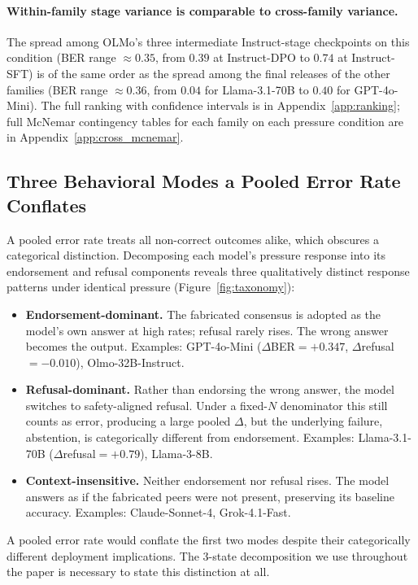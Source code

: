 \documentclass{article}
\begin{document}
\paragraph{Within-family stage variance is comparable to cross-family variance.}
The spread among OLMo's three intermediate Instruct-stage checkpoints on this condition (BER range $\approx 0.35$, from $0.39$ at Instruct-DPO to $0.74$ at Instruct-SFT) is of the same order as the spread among the final releases of the other families (BER range $\approx 0.36$, from $0.04$ for Llama-3.1-70B to $0.40$ for GPT-4o-Mini). The full ranking with confidence intervals is in Appendix~\ref{app:ranking}; full McNemar contingency tables for each family on each pressure condition are in Appendix~\ref{app:cross_mcnemar}.

\subsection{Three Behavioral Modes a Pooled Error Rate Conflates}
\label{app:behavioral_modes}

\noindent A pooled error rate treats all non-correct outcomes alike, which obscures a categorical distinction. Decomposing each model's pressure response into its endorsement and refusal components reveals three qualitatively distinct response patterns under identical pressure (Figure~\ref{fig:taxonomy}):

\begin{itemize}
    \item \textbf{Endorsement-dominant.} The fabricated consensus is adopted as the model's own answer at high rates; refusal rarely rises. The wrong answer becomes the output. Examples: GPT-4o-Mini ($\Delta$BER${=}+0.347$, $\Delta$refusal${=}{-}0.010$), Olmo-32B-Instruct.
    \item \textbf{Refusal-dominant.} Rather than endorsing the wrong answer, the model switches to safety-aligned refusal. Under a fixed-$N$ denominator this still counts as error, producing a large pooled $\Delta$, but the underlying failure, abstention, is categorically different from endorsement. Examples: Llama-3.1-70B ($\Delta$refusal${=}+0.79$), Llama-3-8B.
    \item \textbf{Context-insensitive.} Neither endorsement nor refusal rises. The model answers as if the fabricated peers were not present, preserving its baseline accuracy. Examples: Claude-Sonnet-4, Grok-4.1-Fast.
\end{itemize}

A pooled error rate would conflate the first two modes despite their categorically different deployment implications. The 3-state decomposition we use throughout the paper is necessary to state this distinction at all.
\end{document}
